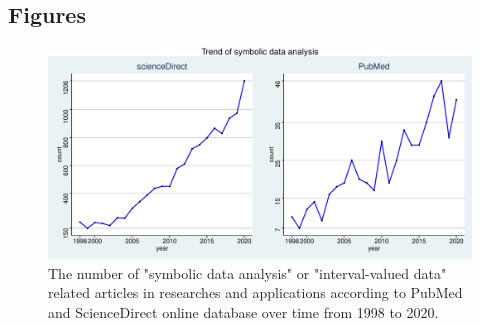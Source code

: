 \documentclass[article]{jss}
\begin{document}
\newpage
\clearpage

\begin{appendix}


\section{Figures} \label{app:figures}
\begin{figure}[t!]
\centering 
\includegraphics[width=1\textwidth]{pic/TrendFig}
\caption{\label{fig:trend}The number of "symbolic data analysis" or "interval-valued data" related articles in researches and applications according to PubMed and ScienceDirect online database over time from 1998 to 2020.}
\end{figure}




\end{appendix}
\end{document}
